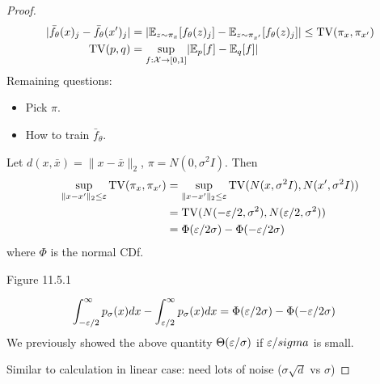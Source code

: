 \begin{proof}
  \begin{align}
    \lvert \bar{f}_\theta(x)_j - \bar{f}_\theta(x')_j \rvert
    &= \lvert \mathbb{E}_{z \sim \pi_x}[ f_\theta (z)_j ] - \mathbb{E}_{z \sim \pi_{x'}}[f_\theta(z)_j]\rvert \leq \operatorname{TV}(\pi_x, \pi_{x'}) \\
    \operatorname{TV}(p,q) &= \sup_{f : \mathcal{X} \to [0,1]} \lvert \mathbb{E}_p[f] - \mathbb{E}_q[f] \rvert
  \end{align}
  Remaining questions:
  \begin{itemize}
    \item Pick $\pi$.
    \item How to train $\bar{f}_\theta$.
  \end{itemize}

  Let $d(x,\bar{x}) = \| x- \bar{x} \|_2$, $\pi = N(0, \sigma^2 I)$. Then
  \begin{align}
    \sup_{\|x - x'\|_2 \leq \varepsilon}
    \operatorname{TV}(\pi_x, \pi_{x'})
    &= \sup_{\|x - x'\|_2 \leq \varepsilon}
    \operatorname{TV}(N(x,\sigma^2 I), N(x', \sigma^2 I)) \\
    &= \operatorname{TV}(N(-\varepsilon/2, \sigma^2), N(\varepsilon/2, \sigma^2)) \\
    &= \Phi(\varepsilon/2\sigma) - \Phi(-\varepsilon/2\sigma)
  \end{align}
  where $\Phi$ is the normal CDf.

  Figure 11.5.1

  \begin{align}
    \int_{-\varepsilon/2}^\infty p_\sigma(x) dx
    - \int_{\varepsilon/2}^\infty p_\sigma(x) dx
    &= \Phi(\varepsilon/2\sigma) - \Phi(-\varepsilon/2\sigma)
  \end{align}
  We previously  showed the above quantity
  $\Theta(\varepsilon/\sigma)$ if $\varepsilon/sigma$ is small.

  Similar to calculation in linear case: need lots of noise
  ($\sigma \sqrt{d}$ vs $\sigma$)


\end{proof}
